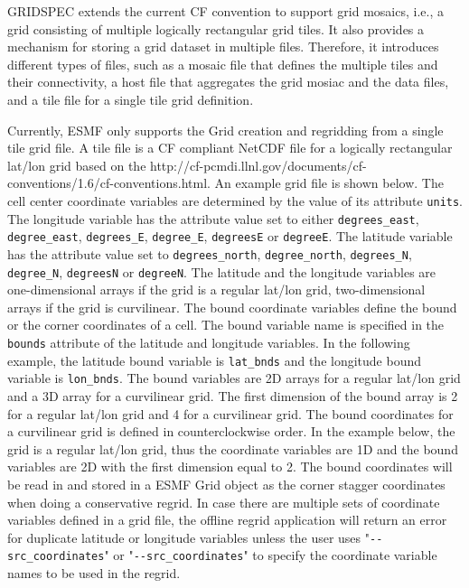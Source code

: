 GRIDSPEC extends the current CF convention to support grid  mosaics, i.e., a grid consisting of multiple logically
rectangular grid tiles. It also provides a mechanism for storing a grid dataset in multiple files.  Therefore,
it introduces different types of files, such as a mosaic file that defines the multiple tiles and their
connectivity, a host file that aggregates the grid mosiac and the data files, and a tile file for a single tile
grid definition.

Currently, ESMF only supports the Grid creation and regridding from a single tile grid file.  A tile file
is a CF compliant NetCDF file for a logically rectangular lat/lon grid based on the
 {http://cf-pcmdi.llnl.gov/documents/cf-conventions/1.6/cf-conventions.html}.   An example grid file is shown below.
The cell center coordinate variables are determined by the value of its attribute {\tt units}.  The longitude
variable has the attribute value set to either {\tt degrees\_east}, {\tt degree\_east}, {\tt degrees\_E}, {\tt degree\_E},
{\tt degreesE} or {\tt degreeE}.  The latitude variable has the attribute value set to {\tt degrees\_north}, {\tt degree\_north}, {\tt degrees\_N},
{\tt degree\_N}, {\tt degreesN} or {\tt degreeN}.   The latitude and the longitude variables are one-dimensional arrays if the grid is a regular lat/lon grid, two-dimensional arrays if the grid is curvilinear. The bound coordinate
variables define the bound or the corner coordinates of a cell.  The bound variable name is specified in the
{\tt bounds} attribute of the latitude and longitude variables.  In the following example, the latitude bound
variable is {\tt lat\_bnds} and the longitude bound variable is {\tt lon\_bnds}.  The bound variables are 2D
arrays for a regular lat/lon grid and a 3D array for a curvilinear grid.  The first dimension of the bound
array is 2 for a regular lat/lon grid and 4 for a curvilinear grid.  The bound coordinates for a curvilinear
grid is defined in counterclockwise order.  In the example below, the grid is a regular lat/lon
grid, thus the coordinate variables are 1D and the bound variables are 2D with the first dimension equal to 2.
The bound coordinates will be read in and stored in a ESMF Grid object as the corner stagger coordinates when doing a conservative regrid.  In case there are multiple sets of coordinate variables defined in a grid file,
the offline regrid application will return an error for duplicate latitude or longitude variables unless the user
uses "{\tt \verb+--+src\_coordinates}" or "{\tt \verb+--+src\_coordinates}" to specify the coordinate variable names
to be used in the regrid.

